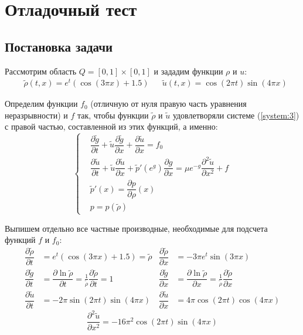 \section{Отладочный тест}

\subsection{Постановка задачи}
Рассмотрим область $Q = [0,1] \times[0, 1]$ и зададим функции $\rho$ и $u$:
\begin{align}
\label{debug_f}
& \tilde{\rho}(t, x) = e^{t} (\cos(3 \pi x) + 1.5) &
& \tilde{u}(t, x) = \cos(2 \pi t) \sin(4 \pi x)
\end{align}

Определим функции $f_{0}$ (отличную от нуля правую часть уравнения неразрывности) и $f$ так, чтобы функции $\tilde{\rho}$ и $\tilde{u}$ удовлетворяли системе (\ref{system:3}) с правой частью, составленной из этих функций, а именно:
\begin{equation*}
\left\{
 \begin{aligned}
  & \dfrac{\partial \tilde{g}}{\partial t} 
    + \tilde{u} \dfrac{\partial \tilde{g}} {\partial x} 
    + \dfrac{\partial \tilde{u}} {\partial x} 
    = f_0 \\
  & \dfrac{\partial \tilde{u}}{\partial t} 
    + \tilde{u} \dfrac{\partial \tilde{u}}{\partial x} 
    + \tilde{p}'(e^{g}) \dfrac{\partial g}{\partial x} 
    = \mu e^{-g} \dfrac{\partial^{2} \tilde{u}}{\partial x ^{2}} 
    + f \\
  & \tilde{p}'(x) = \dfrac{\partial p}{\partial \rho}(x) \\
  & p = p(\tilde{\rho})
 \end{aligned}
\right.
\end{equation*}

Выпишем отдельно все частные производные, необходимые для подсчета функций $f$ и $f_{0}$:
\begin{align*}
  \dfrac{\partial \tilde{\rho}}{\partial t}
    &= e^{t} (\cos(3 \pi x) + 1.5) = \tilde{\rho}
  & \dfrac{\partial \tilde{\rho}}{\partial x}
    &= - 3\pi e^{t} \sin(3 \pi x) \\
  \dfrac{\partial \tilde{g}}{\partial t} 
    &= \dfrac{\partial \ln \tilde{\rho}}{\partial t}
     = \frac{1}{\tilde{\rho}} \dfrac{\partial \tilde{\rho}}{\partial t} = 1 
  & \dfrac{\partial \tilde{g}}{\partial x} 
    &= \dfrac{\partial \ln \tilde{\rho}}{\partial x}
     = \frac{1}{\tilde{\rho}} \dfrac{\partial \tilde{\rho}}{\partial x} \\
  \dfrac{\partial \tilde{u}}{\partial t}
    &= -2\pi \sin(2 \pi t) \sin(4 \pi x) 
  & \dfrac{\partial \tilde{u}}{\partial x}
    &=  4\pi \cos(2 \pi t) \cos(4 \pi x)
\end{align*}
\begin{equation*}
  \dfrac{\partial^{2} \tilde{u}}{\partial x^2}
    = -16\pi^2 \cos(2 \pi t) \sin(4 \pi x)
\end{equation*}

